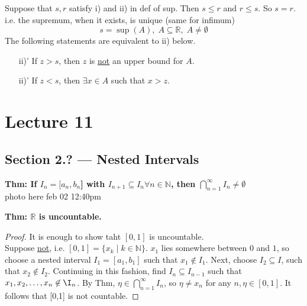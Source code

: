 \documentclass{report}
\newcommand{\N}{\mathbb{N}}  %
\newcommand{\R}{\mathbb{R}}  %
\newcommand{\ul}[1]{\underline{#1}}  %
\theoremstyle{mystyle}
\theoremstyle{customtheorem}
\begin{document}
    Suppose that $s,r$ satisfy i) and ii) in def of sup. Then $s \leq r$ and $r \leq s$. So $s=r$.\\
    i.e. the supremum, when it exists, is unique (same for infimum)
    \[s=\sup(A), \;A \subseteq \R,\; A \neq \emptyset \]
    The following statements are equivalent to ii) below. \vspace{-1em} \begin{enumerate}
        \item[ii)'] If $z>s$, then $z$ is \ul{not} an upper bound for $A$.
        \item[ii)'] If $z < s$, then $\exists x \in A$ such that $x>z$.
    \end{enumerate}

    \pagebreak

    \chapter*{Lecture 11}
    \section*{Section 2.? --- Nested Intervals}
    \textbf{Thm: If $I_n=[a_n,b_n$] with $I_{n+1}\subseteq I_n \forall n \in \N$, then $\bigcap_{n=1}^{\infty} I_n \neq \emptyset$} \\
    photo here feb 02 12:40pm


    \textbf{Thm: $\R$ is uncountable.}
    \begin{proof}
        It is enough to show taht $[0,1]$ is uncountable.\\
        Suppose \ul{not}, i.e. $[0,1]=\{x_k \mid k \in \N\}$. $x_1$ lies somewhere between $0$ and $1$, so choose a nested interval $I_1=[a_1,b_1]$ such that $x_1 \not \in I_1$. Next, choose $I_2 \subseteq I$, such that $x_2 \not \in I_2$. Continuing in this fashion, find $I_n\subseteq I_{n-1}$ such that $x_1, x_2, \ldots, x_n\not\in\I_n$. By Thm, $\eta \in \bigcap_{n=1}^\infty I_n$, so $\eta \neq x_n$ for any $n, \eta\in [0,1]$. It follows that [0,1] is not countable.
    \end{proof}
\end{document}

